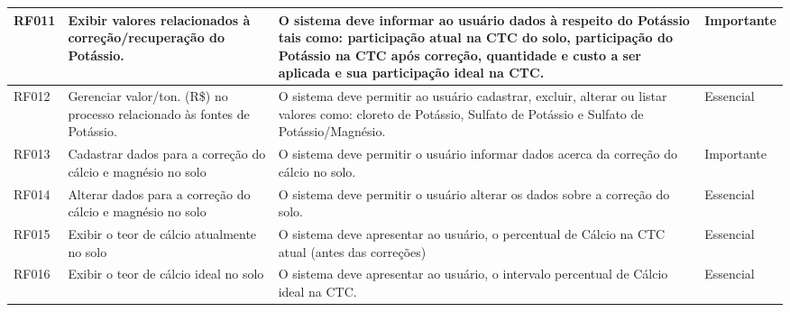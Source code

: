 \begin{landscape}
\begin{longtable}{|p{1.5cm}|p{5cm}|p{9cm}|p{2.5cm}|}
    RF011 & Exibir valores relacionados à correção/recuperação do Potássio.                  & O sistema deve informar ao usuário dados à respeito do Potássio tais como: participação atual na CTC do solo,  participação do Potássio na CTC após correção, quantidade e custo a ser aplicada e sua participação ideal na CTC.                                                                        & Importante \\\hline
    RF012 & Gerenciar valor/ton. (R\$) no processo relacionado às fontes de Potássio.        & O sistema deve permitir ao usuário cadastrar, excluir, alterar ou listar valores como: cloreto de Potássio, Sulfato de Potássio e Sulfato de Potássio/Magnésio.                                                                                                                                         & Essencial  \\\hline
    RF013 & Cadastrar dados para a correção do cálcio e magnésio no solo                     & O sistema deve permitir o usuário informar dados acerca da correção do cálcio no solo.                                                                                                                                                                                                                  & Importante \\\hline
    RF014 & Alterar dados para a correção do cálcio e magnésio no solo                       & O sistema deve permitir o usuário alterar os dados sobre a correção do solo.                                                                                                                                                                                                                            & Essencial  \\\hline
    RF015 & Exibir o teor de cálcio atualmente no solo                                       & O sistema deve apresentar ao usuário, o percentual de Cálcio na CTC atual (antes das correções)                                                                                                                                                                                                         & Essencial  \\\hline
    RF016 & Exibir o teor de cálcio ideal no solo                                            & O sistema deve apresentar ao usuário, o intervalo percentual de Cálcio ideal na CTC.                                                                                                                                                                                                                    & Essencial  \\\hline

\end{longtable}
\end{landscape}
